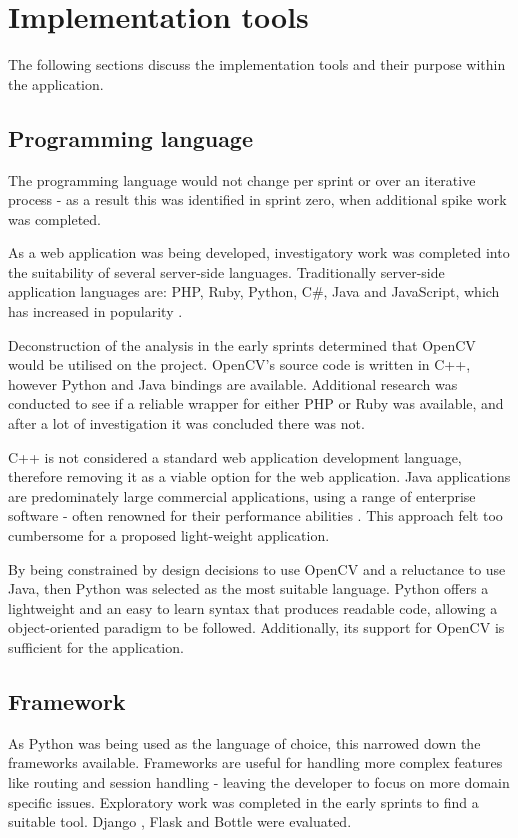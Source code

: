\section{Implementation tools}
The following sections discuss the implementation tools and their purpose within the application.
\subsection{Programming language}
The programming language would not change per sprint or over an iterative process - as a result this was identified in sprint zero, when additional spike work was completed.

As a web application was being developed, investigatory work was completed into the suitability of several server-side languages. Traditionally server-side application languages are: PHP, Ruby, Python, C\#, Java and JavaScript, which has increased in popularity \cite{citeulike:14018462}.

Deconstruction of the analysis in the early sprints determined that OpenCV would be utilised on the project. OpenCV's source code is written in C++, however Python and Java bindings are available. Additional research was conducted to see if a reliable wrapper for either PHP or Ruby was available, and after a lot of investigation it was concluded there was not.

C++ is not considered a standard web application development language,  therefore removing it as a viable option for the web application. Java applications are predominately large commercial applications, using a range of enterprise software - often renowned for their performance abilities \cite{citeulike:14019744}. This approach felt too cumbersome for a proposed light-weight application.

By being constrained by design decisions to use OpenCV and a reluctance to use Java, then Python was selected as the most suitable language. Python offers a lightweight and an easy to learn syntax that produces readable code, allowing a object-oriented paradigm to be followed. Additionally, its support for OpenCV is sufficient for the application.

\subsection{Framework} \label{language:framework}
As Python was being used as the language of choice, this narrowed down the frameworks available. Frameworks are useful for handling more complex features like routing and session handling - leaving the developer to focus on more domain specific issues.   Exploratory work was completed in the early sprints to find a suitable tool. Django \cite{citeulike:14019784}, Flask \cite{citeulike:13160396} and Bottle \cite{citeulike:14019792} were evaluated.

